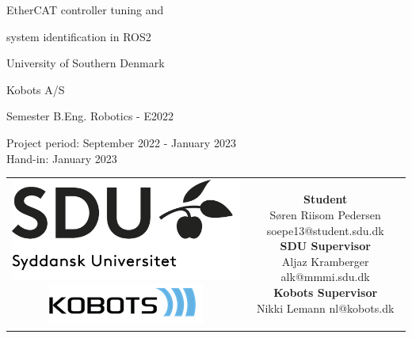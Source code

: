 \begin{titlepage}
	\begin{center}
		
		\null\vspace{2cm}
		
		{\huge
			EtherCAT controller tuning and
			
			\vspace{6pt}
			
			system identification in ROS2
		}
	
		\vspace{1cm}
		
		{\Large
			University of Southern Denmark
			
			\vspace{6pt}
			
			Kobots A/S
		}
		
		\vspace{1cm}
		
		{\small
			 Semester B.Eng. Robotics - E2022
			
			\vspace{12pt}
			
			Project period: September  2022 - January  2023\\
			Hand-in: January  2023
		}
	
		\vfill
		
		\begin{tabular}{cc}
			\parbox{0.25\textwidth}{
				\includegraphics[width=0.25 \textwidth]{../resources/sdu-logo.png} \\
				\vspace{6pt}
				\includegraphics[width=0.25 \textwidth]{../resources/kobots-logo.png}
			}
			&
			\parbox{0.55\textwidth}{
				{\small
					\textbf{Student} \\
					Søren Riisom Pedersen \hfill soepe13@student.sdu.dk \\
					\textbf{SDU Supervisor} \\
					Aljaz Kramberger \hfill alk@mmmi.sdu.dk \\
					\textbf{Kobots Supervisor} \\
					Nikki Lemann \hfill nl@kobots.dk
				}
			}
		\end{tabular}

	\end{center}
\end{titlepage}
